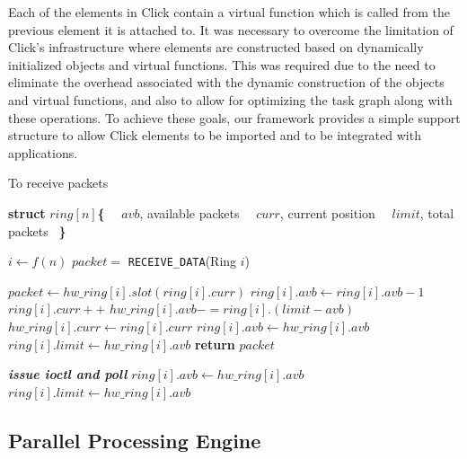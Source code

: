 \documentclass[conference]{IEEEtran}
\begin{document}
Each of the elements in Click contain a virtual function which is called from the previous element it is attached to. It was necessary to overcome the limitation of Click's infrastructure where elements are constructed based on dynamically initialized objects and virtual functions. This was required due to the need to eliminate the overhead associated with the dynamic construction of the objects and virtual functions, and also to allow for optimizing the task graph along with these operations. To achieve these goals, our framework provides a simple support structure to allow Click elements to be imported and to be integrated with applications.
\begin{algorithm}[h]
\caption{To receive packets}
\label{r_pack}
\begin{algorithmic}[1]

\State \textbf{struct} $ring[ n ]$\textbf{\{}
\State {}
\State {}
\State \  \  $avb$, available packets
\State \  \  $curr$, current position
\State \  \  $limit$, total packets \ \textbf{\}}

	\State $i \gets f( n ) $ \label{r_pack_param}
	\State $packet =$ \texttt{RECEIVE\_DATA}(Ring $i$)
\EndWhile
\EndFunction

	\State $packet \gets hw\_ring[ i ].slot( ring[ i ].curr ) $
	\State $ring[ i ].avb \gets ring[ i ].avb - 1$
	\State $ring[ i ].curr++$
	 \label{r_pack_thres}
		\State $hw\_ring[ i ].avb -= ring[ i ].( limit - avb)$
		\State $hw\_ring[ i ].curr \gets ring[ i ].curr$
		\State $ring[ i ].avb \gets hw\_ring[ i ].avb$
		\State $ring[ i ].limit \gets hw\_ring[ i ].avb$
	\EndIf
	\State \textbf{return} $packet$
\EndIf

\State \textbf{\textit{issue ioctl and poll}}
\State $ring[ i ].avb \gets hw\_ring[ i ].avb$
\State $ring[ i ].limit \gets hw\_ring[ i ].avb$
\EndFunction

\end{algorithmic}
\end{algorithm}
\subsection{Parallel Processing Engine}
\end{document}
